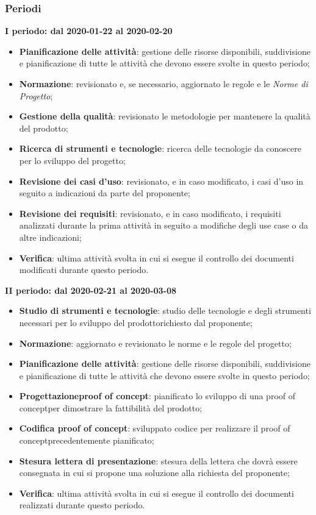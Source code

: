 \subsubsection{Periodi}
\textbf{I periodo: dal 2020-01-22 al 2020-02-20}
\begin{itemize}
	\item \textbf{Pianificazione delle attività}: gestione delle risorse disponibili, suddivisione e pianificazione di tutte le attività che devono essere svolte in questo periodo;
	\item \textbf{Normazione}: revisionato e, se necessario, aggiornato le regole e le \textit{Norme di Progetto};
	\item \textbf{Gestione della qualità}: revisionato le metodologie per mantenere la qualità del prodotto\glo;
	\item \textbf{Ricerca di strumenti e tecnologie}: ricerca delle tecnologie da conoscere per lo sviluppo del progetto\glo;
	\item \textbf{Revisione dei casi d'uso}: revisionato, e in caso modificato, i casi d'uso in seguito a indicazioni da parte del proponente;
	\item \textbf{Revisione dei requisiti}: revisionato, e in caso modificato, i requisiti analizzati durante la prima attività in seguito a modifiche degli use case o da altre indicazioni; 
	\item \textbf{Verifica}: ultima attività svolta in cui si esegue il controllo dei documenti modificati durante questo periodo.
\end{itemize}

\textbf{II periodo: dal 2020-02-21 al 2020-03-08}
\begin{itemize}
	\item \textbf{Studio di strumenti e tecnologie}: studio delle tecnologie e degli strumenti necessari per lo sviluppo del prodotto\glosp richiesto dal proponente;
	\item \textbf{Normazione}: aggiornato e revisionato le norme e le regole del progetto\glo;
	\item \textbf{Pianificazione delle attività}: gestione delle risorse disponibili, suddivisione e pianificazione di tutte le attività che devono essere svolte in questo periodo;
	\item \textbf{Progettazione}\glosp\textbf{proof of concept}\glo: pianificato lo sviluppo di una proof of concept\glosp per dimostrare la fattibilità del prodotto\glo;
	\item \textbf{Codifica proof of concept}\glo: sviluppato codice per realizzare il proof of concept\glosp precedentemente pianificato;
	\item \textbf{Stesura lettera di presentazione}: stesura della lettera che dovrà essere consegnata in cui si propone una soluzione alla richiesta del proponente;
	\item \textbf{Verifica}: ultima attività svolta in cui si esegue il controllo dei documenti realizzati durante questo periodo.
\end{itemize}

